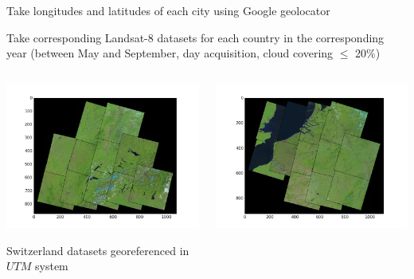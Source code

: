 \documentclass[c]{beamer}
\begin{document}
\begin{frame}
\begin{itemize}
{\begin{columns}
 \end{columns}
 \item Take longitudes and latitudes of each city using Google geolocator
 \item Take corresponding Landsat-8 datasets for each country in the corresponding year (between May and September, day acquisition, cloud covering $\leq$ 20\%)
 \begin{columns}
  \begin{column}{0.33\textwidth}
  \begin{overlayarea}{\linewidth}{3cm}
    \centering\vfill
    \includegraphics[scale=0.20]{images/Switzerland/covering-selection.png}
  \end{overlayarea}
  \begin{overlayarea}{\linewidth}{1cm}
    \centering
    \tiny Switzerland datasets georeferenced in $UTM$ system\par
  \end{overlayarea}
  \end{column}
  \begin{column}{0.33\textwidth}
   \begin{overlayarea}{\linewidth}{3cm}
    \centering\vfill
    \includegraphics[scale=0.20]{images/Belgium/covering-selection.png}

\end{overlayarea}
\end{column}
\end{columns}}
\end{itemize}
\end{frame}
\end{document}
